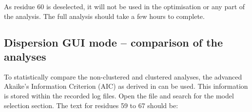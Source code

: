 As residue 60 is deselected, it will not be used in the optimisation or any part of the analysis.
The full analysis should take a few hours to complete.



\subsection{Dispersion GUI mode -- comparison of the analyses}

To statistically compare the non-clustered and clustered analyses, the advanced Akaike's Information Criterion (AIC) as derived in \cite{dAuvergneGooley03} can be used.
This information is stored within the recorded log files.
Open the  file and search for the model selection section.
The text for residues 59 to 67 should be:

